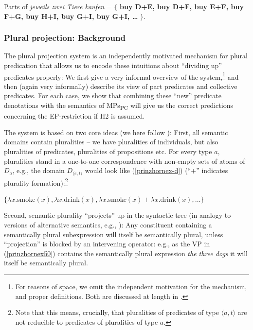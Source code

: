 \documentclass[output=paper,colorlinks,citecolor=brown,
]{langscibook}
\begin{document}
\ea 
Parts of \textit{jeweils zwei Tiere kaufen} = $\{$ \textbf{buy D+E, buy D+F, buy E+F,  buy F+G, buy H+I, buy G+I, buy G+I, \dots} $\}$.\label{prinzhornex46c}
\z

\subsubsection{Plural projection: Background}\label{prinzhornsec:4.2.1}

The plural projection system \citep{Schmitt:2019, Haslinger:2018a, Haslinger:2018b} is an independently motivated mechanism for plural predication that allows us to encode these intuitions about “dividing up” predicates properly: We first give a very informal overview of the system,\footnote{For reasons of space, we omit the independent motivation for the mechanism, and proper definitions. Both are discussed at length in \citealt{Schmitt:2019, Haslinger:2018a, Haslinger:2018b}.} and then (again very informally) describe its view of part predicates and collective predicates. For each case, we show that combining these “new” predicate denotations with the semantics of MPs\textsubscript{PC} will give us the correct predictions concerning the EP-restriction if H2 is assumed.



The system  is based on two core ideas (we here follow \cite{Haslinger:2018b}): First, all semantic domains contain pluralities -- we have pluralities of individuals, but also pluralities of predicates, pluralities of propositions etc. For every type $a$, pluralities stand in a one-to-one correspondence with non-empty sets of atoms of $D_{a}$, e.g., the domain $D_{\langle e, t \rangle}$ would look like (\ref{prinzhornex-d}) (“+” indicates plurality formation):\footnote{Note that this means, crucially, that pluralities of predicates of type $\langle a,t \rangle$ are not reducible to predicates of  pluralities of type $a$.} 

\ea	 $\{ \lambda x. $smoke$(x), \lambda x. $drink$(x), \lambda x. $smoke$(x) + \lambda x.  $drink$(x), \dots\}$ \label{prinzhornex-d} \z

Second, semantic plurality “projects” up in the syntactic tree (in analogy to versions of alternative semantics, e.g., \citealt{Rooth:1985}):
 Any constituent containing a semantically plural subexpression will itself be semantically plural, unless “projection”  is blocked by an intervening operator: e.g., as the VP in (\ref{prinzhornex50}) contains the semantically plural expression \textit{the three dogs} it will itself be semantically plural.
 
\end{document}
